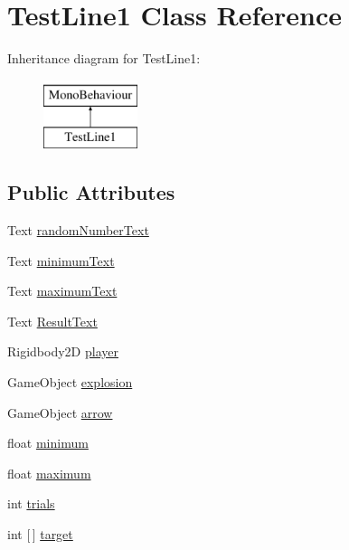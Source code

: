 \hypertarget{classTestLine1}{}\section{Test\+Line1 Class Reference}
\label{classTestLine1}
Inheritance diagram for Test\+Line1\+:\begin{figure}[H]
\begin{center}
\leavevmode
\includegraphics[height=2.000000cm]{classTestLine1}
\end{center}
\end{figure}
\subsection*{Public Attributes}
\begin{DoxyCompactItemize}
\item 
Text \hyperlink{classTestLine1_a21289056dbe86698df6cc609da19194e}{random\+Number\+Text}
\item 
Text \hyperlink{classTestLine1_a2074231e648b0dbb0ec7c8569837370a}{minimum\+Text}
\item 
Text \hyperlink{classTestLine1_ad1476ffb63c9b53642a9f27d2619f5f3}{maximum\+Text}
\item 
Text \hyperlink{classTestLine1_ac3d1f6d386ed0eb304eb18e8c872c8a5}{Result\+Text}
\item 
Rigidbody2D \hyperlink{classTestLine1_a79bfe38a9b618f57d2335289f170a819}{player}
\item 
Game\+Object \hyperlink{classTestLine1_a6099bcd6bb6ce98f49fdebf5b346d3b7}{explosion}
\item 
Game\+Object \hyperlink{classTestLine1_af9c1263870a0427ad6aa88c486e6367c}{arrow}
\item 
float \hyperlink{classTestLine1_a942aca198616b990c7bfd729e17659da}{minimum}
\item 
float \hyperlink{classTestLine1_a35ee62dc1f40b32c57b4652f036c41df}{maximum}
\item 
int \hyperlink{classTestLine1_a533c8bc73c48db7b94b0a4b98ac2e307}{trials}
\item 
int \mbox{[}$\,$\mbox{]} \hyperlink{classTestLine1_a7f5d0d4f0922b32d920f349ac3a28f0e}{target}
\end{DoxyCompactItemize}


